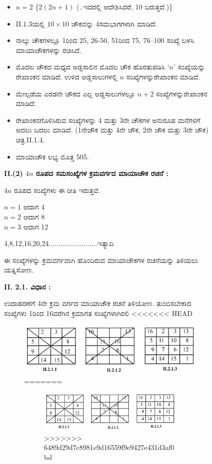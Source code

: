 \begin{figure}[H]
\newpage

\begin{itemize}
	\item $n=2$ \{$2(2n+1)$ (..ಇದರಲ್ಲಿ ಆದೇಶಿಸಿದರೆ, 10 ಬರುತ್ತದೆ.)\}
	\item II.1.3ಯಲ್ಲಿ $10\times 10$ ಚೌಕವನ್ನು 4ಸಮಭಾಗಗಳಾಗಿ ಮಾಡಿದೆ.
	\item ನಾಲ್ಕು ಚೌಕಗಳಲ್ಲೂ 1ರಿಂದ 25, 26-50, 51ರಿಂದ 75, 76--100 ಸಂಖ್ಯೆ ಬಳಸಿ ಮಾಯಾಚೌಕಗಳನ್ನು ರಚಿಸಿದೆ.
	\item ಮೊದಲ ಚೌಕದ ಮಧ್ಯದ ಅಡ್ಡಸಾಲಿನ ಮೊದಲ ಚೌಕ ಹೊರತುಪಡಿಸಿ $‘n’$ ಸಂಖ್ಯೆಯನ್ನು ರೇಖಾಂಕನ ಮಾಡಿದೆ. ಉಳಿದ ಅಡ್ಡಸಾಲುಗಳಲ್ಲಿ $n$ ಸಂಖ್ಯೆಗಳನ್ನು\break ರೇಖಾಂಕನ ಮಾಡಿದೆ.
	\item ಮೇಲ್ಗಡೆಯ ಎರಡನೇ ಚೌಕದ ಎಲ್ಲ ಅಡ್ಡಸಾಲುಗಳಲ್ಲೂ $n+2$ ಸಂಖ್ಯೆಗಳನ್ನು\break ರೇಖಾಂಕನ ಮಾಡಿದೆ.
	\item ರೇಖಾಂಕನಗೊಳಿಸಿರುವ ಸಂಖ್ಯೆಗಳನ್ನು 4 ಮತ್ತು 3ನೇ ಚೌಕಗಳ ಅನುರೂಪ ಮನೆ\-ಗಳಿಗೆ ಅದಲು ಬದಲು ಮಾಡಿದೆ. (1ನೇಚೌಕ ಮತ್ತು 4ನೇ ಚೌಕ, 2ನೇ ಚೌಕ ಮತ್ತು 3ನೇ ಚೌಕ) ಚಿತ್ರ.II.1.4.
	\item ಮಾಯಾಚೌಕ ಲಭ್ಯ ಮೊತ್ತ 505.
\end{itemize}

\smallskip
\noindent
\textbf{II.(2) $4n$ ರೂಪದ ಸಮಸಂಖ್ಯೆಗಳ ಕ್ರಮವರ್ಗದ ಮಾಯಾಚೌಕ ರಚನೆ :}
\smallskip

$4n$ ರೂಪದ ಸಂಖ್ಯೆಗಳು ಈ ರೀತಿ ಇರುತ್ತವೆ.
\begin{center}
$n=1$ ಆದಾಗ 4\\
$n=2$ ಆದಾಗ 8\\
$n=3$ ಆದಾಗ 12
\end{center}
4,8,12,16,20,24.........................ಇತ್ಯಾದಿ

ಈ ಸಂಖ್ಯೆಗಳನ್ನು ಕ್ರಮವರ್ಗವಾಗಿ ಹೊಂದಿರುವ ಮಾಯಾಚೌಕಗಳ ರಚನೆಯನ್ನು ತಿಳಿಯಲು ಯತ್ನಿಸೋಣ.

\textbf{II. 2.1. ವಿಧಾನ :}

ಉದಾಹರಣೆಗೆ 4ನೇ ಕ್ರಮ ವರ್ಗದ ಮಾಯಾಚೌಕ ರಚನೆ ತಿಳಿಯೋಣ. ತುಂಬಿಸಬೇಕಾದ ಸಂಖ್ಯೆಗಳು 1ರಿಂದ 16ವರೆಗಿನ ಕ್ರಮಾಗತ ಸಂಖ್ಯೆಗಳಾಗಿರಲಿ
<<<<<<< HEAD
\begin{figure}[H]
\includegraphics[scale=.9]{src/figures/chap3/fig3-16.jpg}
=======

\newpage

\begin{figure}[H]
\includegraphics[scale=.8]{src/figures/chap3/fig3.16.jpg}
>>>>>>> 6489d29d7c8981e9d16559f9e9427e431d3af0bd
\end{figure}


\end{figure}
\end{figure}
